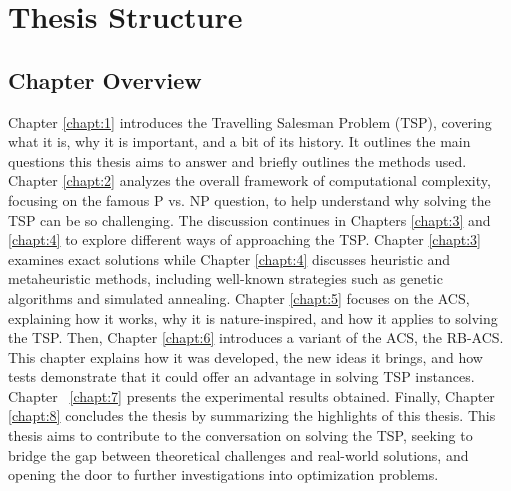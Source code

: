 
\section{Thesis Structure}

\subsection{Chapter Overview}
Chapter \ref{chapt:1} introduces the Travelling Salesman Problem (TSP), covering what it is, why it is important, and a bit of its history. It outlines the main questions this thesis aims to answer and briefly outlines the methods used.
Chapter \ref{chapt:2} analyzes the overall framework of computational complexity, focusing on the famous P vs. NP question, to help understand why solving the \Gls{TSP} can be so challenging.
The discussion continues in Chapters \ref{chapt:3} and \ref{chapt:4} to explore different ways of approaching the \Gls{TSP}. Chapter \ref{chapt:3} examines exact solutions while Chapter \ref{chapt:4} discusses heuristic and metaheuristic methods, including well-known strategies such as genetic algorithms and simulated annealing.
Chapter \ref{chapt:5} focuses on the \Gls{ACS}, explaining how it works, why it is nature-inspired, and how it applies to solving the \Gls{TSP}.
Then, Chapter \ref{chapt:6} introduces a variant of the \Gls{ACS}, the \Gls{RB-ACS}. This chapter explains how it was developed, the new ideas it brings, and how tests demonstrate that it could offer an advantage in solving \Gls{TSP} instances.
Chapter ~\ref{chapt:7} presents the experimental results obtained.
Finally, Chapter \ref{chapt:8} concludes the thesis by summarizing the highlights of this thesis.
This thesis aims to contribute to the conversation on solving the \Gls{TSP}, seeking to bridge the gap between theoretical challenges and real-world solutions, and opening the door to further investigations into optimization problems.
